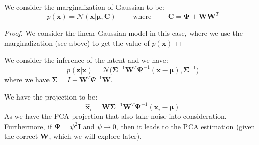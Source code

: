 \begin{proposition}
    We consider the marginalization of Gaussian to be:
    \begin{equation*}
        p(\boldsymbol x) = \mathcal{N}(\boldsymbol x | \boldsymbol \mu, \boldsymbol C) \qquad \text{ where } \qquad \boldsymbol C = \boldsymbol \Psi + \boldsymbol W\boldsymbol W^T
    \end{equation*}
\end{proposition}
\begin{proof}
    We consider the linear Gaussian model in this case, where we use the marginalization (see above) to get the value of $p(\boldsymbol x)$
\end{proof}

\begin{proposition}
    We consider the inference of the latent and we have:
    \begin{equation*}
        p(\boldsymbol z | \boldsymbol x) = \mathcal{N}\Big(\boldsymbol \Sigma^{-1}\boldsymbol W^T\boldsymbol \Psi^{-1}(\boldsymbol x - \boldsymbol \mu), \boldsymbol \Sigma^{-1} \Big)
    \end{equation*}     
    where we have $\boldsymbol \Sigma = I + \boldsymbol W^T\Psi^{-1}\boldsymbol W$. 
\end{proposition}

\begin{remark}
    We have the projection to be:
    \begin{equation*}
        \hat{\boldsymbol x}_i = \boldsymbol W\boldsymbol \Sigma^{-1}\boldsymbol W^T\boldsymbol \Psi^{-1}(\boldsymbol x_i - \boldsymbol \mu)
    \end{equation*}
    As we have the PCA projection that also take noise into consideration. Furthermore, if $\boldsymbol \Psi = \psi^2 \boldsymbol I$ and $\psi \rightarrow0$, then it leads to the PCA estimation (given the correct $\boldsymbol W$, which we will explore later). 
\end{remark}

